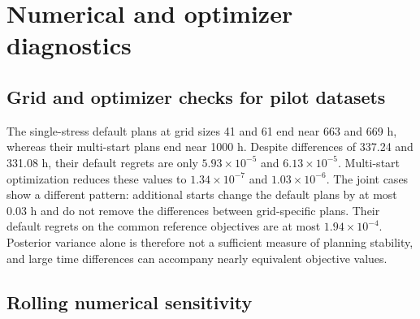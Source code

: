\documentclass[a4paper,fleqn]{cas-sc}
\begin{document}
\begin{table}[pos=H]
\centering
\caption{Paired RMSE reductions and 95\% bootstrap intervals. Positive values favor the first policy.}
\label{tab:singlereductions}
\resizebox{\textwidth}{!}{}
\end{table}

\clearpage
\section{Numerical and optimizer diagnostics}
\label{app:numerical}

\subsection{Grid and optimizer checks for pilot datasets}

\begin{table}[pos=H]
\centering
\caption{Grid and optimizer checks for pilot replicate 1. Multi-start adds four random starts to the default start. Every plan is evaluated on the finest-grid posterior for that scenario using the same 256 draws. Regret is the excess mean log variance relative to the best value found among the evaluated plans, and $\Delta t_{\mathrm{MS}}$ is the maximum time difference between default and multi-start plans.}
\label{tab:grid}
\resizebox{\textwidth}{!}{}
\end{table}

The single-stress default plans at grid sizes 41 and 61 end near 663 and 669 h, whereas their multi-start plans end near 1000 h. Despite differences of 337.24 and 331.08 h, their default regrets are only $5.93\times10^{-5}$ and $6.13\times10^{-5}$. Multi-start optimization reduces these values to $1.34\times10^{-7}$ and $1.03\times10^{-6}$. The joint cases show a different pattern: additional starts change the default plans by at most 0.03 h and do not remove the differences between grid-specific plans. Their default regrets on the common reference objectives are at most $1.94\times10^{-4}$. Posterior variance alone is therefore not a sufficient measure of planning stability, and large time differences can accompany nearly equivalent objective values.

\subsection{Rolling numerical sensitivity}
\end{document}
